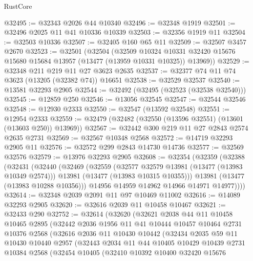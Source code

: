 \begin{lexlean}{RustCore}
\begin{coremodule}
@32495 := @32343 @2026 @44 @10340
@32496 := @32348 @1919
@32501 := @32496 @2025 @11 @41 @10336 @10339
@32503 := @32356 @1919 @11
@32504 := @32503 @10336
@32507 := @32405 @160 @65 @11
@32509 := @32507 @3457 @2670
@32523 := @32501
    (@32504
      (@32509
        @10324
        @10331
        @32420
        @15676
        @15680
        @15684
        @13957
        (@13477 (@13959 @10331 @10325))
        @13969))
@32529 := @32348 @211 @219 @11 @27 @3623 @2635
@32537 := @32377 @74 @11 @74 @3623 (@13205 (@32382 @74)) @16651
@32538 := @32529 @32537
@32540 := @13581 @32293 @2905
@32544 := @32492 (@32495 (@32523 (@32538 @32540)))
@32545 := @12859 @250
@32546 := @13056 @32545
@32547 := @32544 @32546
@32548 := @12930 @2333
@32550 := @32547 (@13592 @32548)
@32551 := @12954 @2333
@32559 := @32479 (@32482 (@32550 (@13596 @32551) (@13601 (@13603 @250)) @13969))
@32567 := @32442 @300 @219 @11 @27 @2843 @2574 @2635 @2731
@32569 := @32567 @10348 @2568
@32572 := @14719 @32293 @2905 @11
@32576 := @32572 @299 @2843 @14730 @14736
@32577 := @32569 @32576
@32579 := @13976 @32293 @2905
@32608 := @32354
    (@32359
      (@32388
        (@32431
          (@32440
            (@32469
              (@32559
                (@32577 @32579 @13981 (@13477 (@13983 @10349 @2574)))
                @13981
                (@13477 (@13983 @10315 @10355)))
              @13981
              (@13477 (@13983 @10288 @10356)))
            @14956
            @14959
            @14962
            @14966
            @14971
            @14977))))
@32614 := @32348 @2039 @2091 @11 @97 @10469 @11002
@32616 := @14089 @32293 @2905
@32620 := @32616 @2039 @11 @10458 @10467
@32621 := @32433 @290
@32752 := @32614
    (@32620
      (@32621
        @2038
        @44
        @11
        @10458
        @10465
        @2895
        (@32442
          @2036
          @1956
          @11
          @41
          @10444
          @10457
          @10464
          @2731
          @10376
          @2568
          (@32616
            @2036
            @11
            @10430
            @10442
            (@32434
              @2035
              @59
              @11
              @10430
              @10440
              @2957
              (@32443
                @2034
                @11
                @44
                @10405
                @10429
                @10439
                @2731
                @10384
                @2568
                (@32454
                  @10405
                  (@32410
                    @10392
                    @10400
                    @32420
                    @15676

\end{coremodule}
\end{lexlean}
